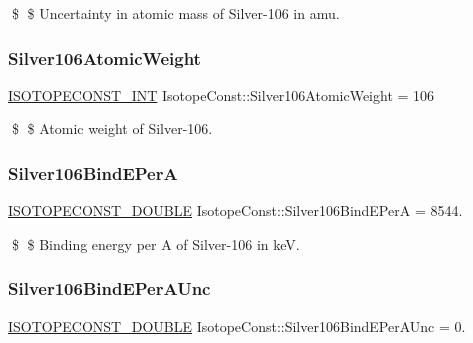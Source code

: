 \$ \$ Uncertainty in atomic mass of Silver-\/106 in amu. \mbox{\label{group___isotope_const-_silver-_ag106_ga78b376274e4ebc0ef2610f21814eb22a}} 
\subsubsection{\texorpdfstring{Silver106\+Atomic\+Weight}{Silver106AtomicWeight}}
{\footnotesize\ttfamily \mbox{\hyperlink{group___isotope_const-_macros_ga5f18360b3e99483a35c32d789e62621c}{I\+S\+O\+T\+O\+P\+E\+C\+O\+N\+S\+T\+\_\+\+I\+NT}} Isotope\+Const\+::\+Silver106\+Atomic\+Weight = 106}

\$ \$ Atomic weight of Silver-\/106. \mbox{\label{group___isotope_const-_silver-_ag106_ga93e47264f42f6bc52e41c65bd0f2b940}} 
\subsubsection{\texorpdfstring{Silver106\+Bind\+E\+PerA}{Silver106BindEPerA}}
{\footnotesize\ttfamily \mbox{\hyperlink{group___isotope_const-_macros_ga8f45a7272ce02c0b4c65c44636ed719a}{I\+S\+O\+T\+O\+P\+E\+C\+O\+N\+S\+T\+\_\+\+D\+O\+U\+B\+LE}} Isotope\+Const\+::\+Silver106\+Bind\+E\+PerA = 8544.}

\$ \$ Binding energy per A of Silver-\/106 in keV. \mbox{\label{group___isotope_const-_silver-_ag106_ga43ecf3fad7ab424099ce6d2b403d3106}} 
\subsubsection{\texorpdfstring{Silver106\+Bind\+E\+Per\+A\+Unc}{Silver106BindEPerAUnc}}
{\footnotesize\ttfamily \mbox{\hyperlink{group___isotope_const-_macros_ga8f45a7272ce02c0b4c65c44636ed719a}{I\+S\+O\+T\+O\+P\+E\+C\+O\+N\+S\+T\+\_\+\+D\+O\+U\+B\+LE}} Isotope\+Const\+::\+Silver106\+Bind\+E\+Per\+A\+Unc = 0.}

